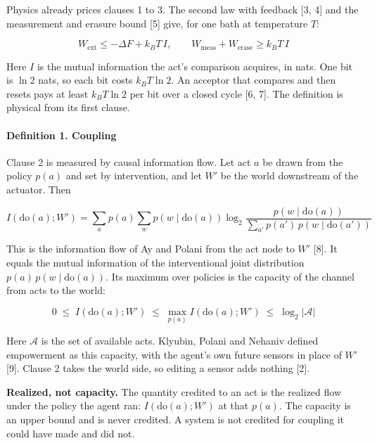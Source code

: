 \documentclass[
  10pt,
]{article}
\begin{document}
Physics already prices clauses 1 to 3. The second law with feedback
{[}3, 4{]} and the measurement and erasure bound {[}5{]} give, for one
bath at temperature \(T\):

\[W_{\mathrm{ext}} \le -\Delta F + k_B T\, I, \qquad W_{\mathrm{meas}} + W_{\mathrm{erase}} \ge k_B T\, I\]

Here \(I\) is the mutual information the act's comparison acquires, in
nats. One bit is \(\ln 2\) nats, so each bit costs \(k_B T\ln 2\). An
acceptor that compares and then resets pays at least \(k_B T \ln 2\) per
bit over a closed cycle {[}6, 7{]}. The definition is physical from its
first clause.

\paragraph{Definition 1. Coupling}\label{definition-1.-coupling}

Clause 2 is measured by causal information flow. Let act \(a\) be drawn
from the policy \(p(a)\) and set by intervention, and let \(W'\) be the
world downstream of the actuator. Then

\[I(\mathrm{do}(a); W') = \sum_{a} p(a) \sum_{w} p(w \mid \mathrm{do}(a)) \log_2 \frac{p(w \mid \mathrm{do}(a))}{\sum_{a'} p(a')\, p(w \mid \mathrm{do}(a'))}\]

This is the information flow of Ay and Polani from the act node to
\(W'\) {[}8{]}. It equals the mutual information of the interventional
joint distribution \(p(a)\,p(w \mid \mathrm{do}(a))\). Its maximum over
policies is the capacity of the channel from acts to the world:

\[0 \;\le\; I(\mathrm{do}(a); W') \;\le\; \max_{p(a)} I(\mathrm{do}(a); W') \;\le\; \log_2 |\mathcal{A}|\]

Here \(\mathcal{A}\) is the set of available acts. Klyubin, Polani and
Nehaniv defined empowerment as this capacity, with the agent's own
future sensors in place of \(W'\) {[}9{]}. Clause 2 takes the world
side, so editing a sensor adds nothing {[}2{]}.

\textbf{Realized, not capacity.} The quantity credited to an act is the
realized flow under the policy the agent ran: \(I(\mathrm{do}(a); W')\)
at that \(p(a)\). The capacity is an upper bound and is never credited.
A system is not credited for coupling it could have made and did not.
\end{document}
